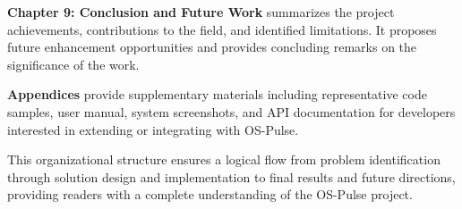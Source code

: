 \textbf{Chapter 9: Conclusion and Future Work} summarizes the project achievements, contributions to the field, and identified limitations. It proposes future enhancement opportunities and provides concluding remarks on the significance of the work.

\textbf{Appendices} provide supplementary materials including representative code samples, user manual, system screenshots, and API documentation for developers interested in extending or integrating with OS-Pulse.

This organizational structure ensures a logical flow from problem identification through solution design and implementation to final results and future directions, providing readers with a complete understanding of the OS-Pulse project.
